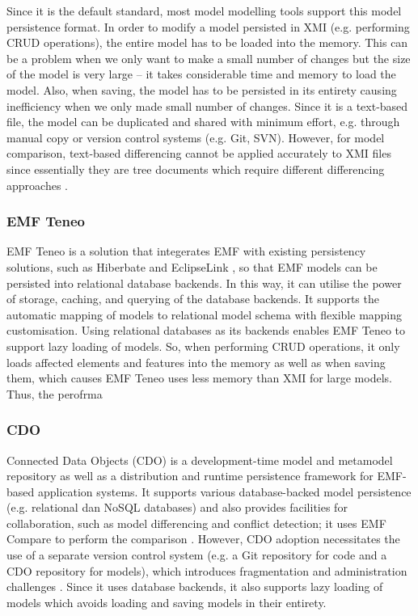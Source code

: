 Since it is the default standard, most model modelling tools support this model persistence format. In order to modify a model persisted in XMI (e.g. performing CRUD operations), the entire model has to be loaded into the memory. This can be a problem when we only want to make a small number of changes but the size of the model is very large -- it takes considerable time and memory to load the model. Also, when saving, the model has to be persisted in its entirety causing inefficiency when we only made small number of changes. Since it is a text-based file, the model can be duplicated and shared with minimum effort, e.g. through manual copy or version control systems (e.g. Git, SVN). 
However, for model comparison, text-based differencing \cite{DBLP:journals/algorithmica/Meyers86} cannot be applied accurately to XMI files since essentially they are tree documents which require different differencing approaches \cite{wang2003xdiff}.

\subsubsection{EMF Teneo}
\label{sec:emf_teneo}
EMF Teneo \cite{eclipse2017teneo} is a solution that integerates EMF with existing persistency solutions, such as Hiberbate \cite{hibernate2019hibernateorm} and EclipseLink \cite{eclipse2019eclipselink}, so that EMF models can be persisted into relational database backends. In this way, it can utilise the power of storage, caching, and querying of the database backends. It supports the automatic mapping of models to relational model schema with flexible mapping customisation. Using relational databases as its backends enables EMF Teneo to support lazy loading of models. So, when performing CRUD operations, it only loads affected elements and features into the memory as well as when saving them, which causes EMF Teneo uses less memory than XMI for large models. Thus, the perofrma  

\subsubsection{CDO}
\label{sec:cdo}
Connected Data Objects (CDO) \cite{eclipse2019cdo} is a development-time model and metamodel repository as well as a distribution and runtime persistence framework for EMF-based application systems. It supports various database-backed model persistence (e.g. relational dan NoSQL databases) and also provides facilities for collaboration, such as model differencing and conflict detection; it uses EMF Compare \cite{emfcompare2018developer} to perform the comparison \cite{cdo2019emfcompare}. However, CDO adoption necessitates the use of a separate version control system (e.g. a Git repository for code and a CDO repository for models), which introduces fragmentation and administration challenges \cite{barmpis2014evaluation}. Since it uses database backends, it also supports lazy loading of models which avoids loading and saving models in their entirety. 

